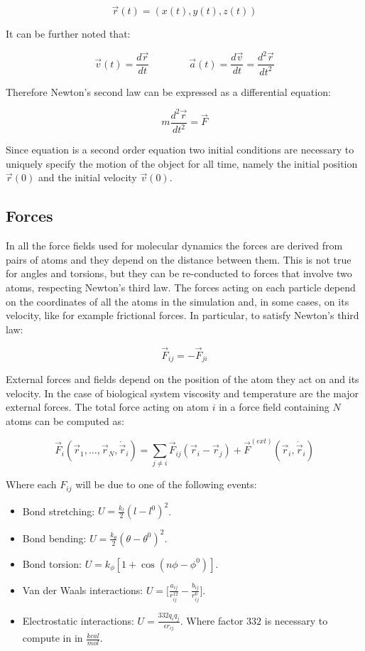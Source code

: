 	\begin{equation}
		\vec{r}(t) = (x(t), y(t), z(t))
	\end{equation}

	It can be further noted that:

	$$\vec{v}(t) = \frac{d\vec{r}}{dt}\qquad\qquad \vec{a}(t) = \frac{d\vec{v}}{dt} = \frac{d^2\vec{r}}{dt^2}$$

	Therefore Newton's second law can be expressed as a differential equation:

	\begin{equation}
		m\frac{d^2\vec{r}}{dt^2} = \vec{F}
		\label{eqs:diff-newt}
	\end{equation}

	Since equation \label{eqs:diff-newt} is a second order equation two initial conditions are necessary to uniquely specify the motion of the object for all time, namely the initial position $\vec{r}(0)$ and the initial velocity $\vec{v}(0)$.

	\subsection{Forces}
	In all the force fields used for molecular dynamics the forces are derived from pairs of atoms and they depend on the distance between them.
	This is not true for angles and torsions, but they can be re-conducted to forces that involve two atoms, respecting Newton's third law.
	The forces acting on each particle depend on the coordinates of all the atoms in the simulation and, in some cases, on its velocity, like for example frictional forces.
	In particular, to satisfy Newton's third law:

	$$\vec{F}_{ij} = -\vec{F}_{ji}$$

	External forces and fields depend on the position of the atom they act on and its velocity.
	In the case of biological system viscosity and temperature are the major external forces.
	The total force acting on atom $i$ in a force field containing $N$ atoms can be computed as:

	$$\vec{F}_i(\vec{r}_1, \dots, \vec{r}_N, \dot{\vec{r}}_i) = \sum\limits_{j\neq i}\vec{F}_{ij}(\vec{r}_i-\vec{r}_j)+\vec{F}^{(ext)}(\vec{r}_i, \dot{\vec{r}}_i)$$

	Where each $F_{ij}$ will be due to one of the following events:

	\begin{itemize}
		\item Bond stretching: $U = \frac{k_l}{2}(l-l^0)^2$.
		\item Bond bending: $U = \frac{k_\theta}{2}(\theta-\theta^0)^2$.
		\item Bond torsion: $U = k_\phi[1+\cos(n\phi-\phi^0)]$.
		\item Van der Waals interactions: $U = \biggl[\frac{a_{ij}}{r_{ij}^{12}}-\frac{b_{ij}}{r_{ij}^6}\biggr]$.
		\item Electrostatic interactions: $U = \frac{332q_iq_j}{\epsilon r_{ij}}$.
			Where factor $332$ is necessary to compute in in $\frac{kcal}{mol}$.
	\end{itemize}

